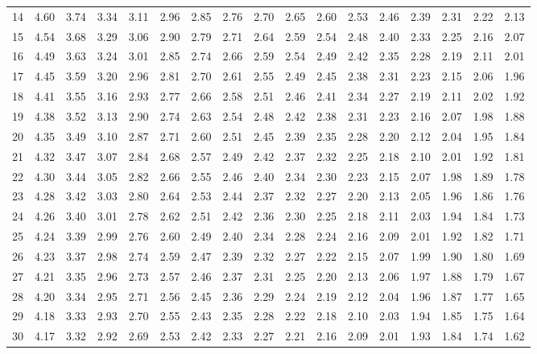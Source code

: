 \begin{center}
\begin{tabular}{r|cccccccccccccccc}
14 & 4.60 & 3.74 & 3.34 & 3.11 & 2.96 & 2.85 & 2.76 & 2.70 & 2.65 & 2.60 & 2.53 & 2.46 & 2.39 & 2.31 & 2.22 & 2.13\\
15 & 4.54 & 3.68 & 3.29 & 3.06 & 2.90 & 2.79 & 2.71 & 2.64 & 2.59 & 2.54 & 2.48 & 2.40 & 2.33 & 2.25 & 2.16 & 2.07\\
16 & 4.49 & 3.63 & 3.24 & 3.01 & 2.85 & 2.74 & 2.66 & 2.59 & 2.54 & 2.49 & 2.42 & 2.35 & 2.28 & 2.19 & 2.11 & 2.01\\
17 & 4.45 & 3.59 & 3.20 & 2.96 & 2.81 & 2.70 & 2.61 & 2.55 & 2.49 & 2.45 & 2.38 & 2.31 & 2.23 & 2.15 & 2.06 & 1.96\\
18 & 4.41 & 3.55 & 3.16 & 2.93 & 2.77 & 2.66 & 2.58 & 2.51 & 2.46 & 2.41 & 2.34 & 2.27 & 2.19 & 2.11 & 2.02 & 1.92\\
19 & 4.38 & 3.52 & 3.13 & 2.90 & 2.74 & 2.63 & 2.54 & 2.48 & 2.42 & 2.38 & 2.31 & 2.23 & 2.16 & 2.07 & 1.98 & 1.88\\
20 & 4.35 & 3.49 & 3.10 & 2.87 & 2.71 & 2.60 & 2.51 & 2.45 & 2.39 & 2.35 & 2.28 & 2.20 & 2.12 & 2.04 & 1.95 & 1.84\\
21 & 4.32 & 3.47 & 3.07 & 2.84 & 2.68 & 2.57 & 2.49 & 2.42 & 2.37 & 2.32 & 2.25 & 2.18 & 2.10 & 2.01 & 1.92 & 1.81\\
22 & 4.30 & 3.44 & 3.05 & 2.82 & 2.66 & 2.55 & 2.46 & 2.40 & 2.34 & 2.30 & 2.23 & 2.15 & 2.07 & 1.98 & 1.89 & 1.78\\
23 & 4.28 & 3.42 & 3.03 & 2.80 & 2.64 & 2.53 & 2.44 & 2.37 & 2.32 & 2.27 & 2.20 & 2.13 & 2.05 & 1.96 & 1.86 & 1.76\\
24 & 4.26 & 3.40 & 3.01 & 2.78 & 2.62 & 2.51 & 2.42 & 2.36 & 2.30 & 2.25 & 2.18 & 2.11 & 2.03 & 1.94 & 1.84 & 1.73\\
25 & 4.24 & 3.39 & 2.99 & 2.76 & 2.60 & 2.49 & 2.40 & 2.34 & 2.28 & 2.24 & 2.16 & 2.09 & 2.01 & 1.92 & 1.82 & 1.71\\
26 & 4.23 & 3.37 & 2.98 & 2.74 & 2.59 & 2.47 & 2.39 & 2.32 & 2.27 & 2.22 & 2.15 & 2.07 & 1.99 & 1.90 & 1.80 & 1.69\\
27 & 4.21 & 3.35 & 2.96 & 2.73 & 2.57 & 2.46 & 2.37 & 2.31 & 2.25 & 2.20 & 2.13 & 2.06 & 1.97 & 1.88 & 1.79 & 1.67\\
28 & 4.20 & 3.34 & 2.95 & 2.71 & 2.56 & 2.45 & 2.36 & 2.29 & 2.24 & 2.19 & 2.12 & 2.04 & 1.96 & 1.87 & 1.77 & 1.65\\
29 & 4.18 & 3.33 & 2.93 & 2.70 & 2.55 & 2.43 & 2.35 & 2.28 & 2.22 & 2.18 & 2.10 & 2.03 & 1.94 & 1.85 & 1.75 & 1.64\\
30 & 4.17 & 3.32 & 2.92 & 2.69 & 2.53 & 2.42 & 2.33 & 2.27 & 2.21 & 2.16 & 2.09 & 2.01 & 1.93 & 1.84 & 1.74 & 1.62\\

\end{tabular}
\end{center}
